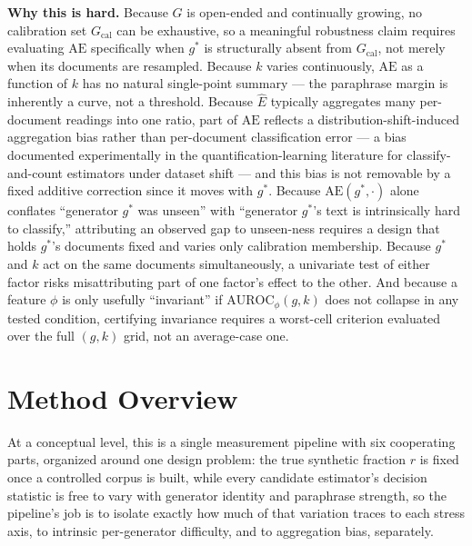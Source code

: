 \documentclass[11pt]{article}
\begin{document}
\noindent\textbf{Why this is hard.} Because $G$ is open-ended and continually growing, no calibration set $G_{\text{cal}}$ can be exhaustive, so a meaningful robustness claim requires evaluating $\mathrm{AE}$ specifically when $g^*$ is structurally absent from $G_{\text{cal}}$, not merely when its documents are resampled. Because $k$ varies continuously, $\mathrm{AE}$ as a function of $k$ has no natural single-point summary --- the paraphrase margin is inherently a curve, not a threshold. Because $\hat{E}$ typically aggregates many per-document readings into one ratio, part of $\mathrm{AE}$ reflects a distribution-shift-induced aggregation bias rather than per-document classification error --- a bias documented experimentally in the quantification-learning literature for classify-and-count estimators under dataset shift \citep{QuantDatasetShift2023} --- and this bias is not removable by a fixed additive correction since it moves with $g^*$. Because $\mathrm{AE}(g^*, \cdot)$ alone conflates ``generator $g^*$ was unseen'' with ``generator $g^*$'s text is intrinsically hard to classify,'' attributing an observed gap to unseen-ness requires a design that holds $g^*$'s documents fixed and varies only calibration membership. Because $g^*$ and $k$ act on the same documents simultaneously, a univariate test of either factor risks misattributing part of one factor's effect to the other. And because a feature $\phi$ is only usefully ``invariant'' if $\mathrm{AUROC}_\phi(g,k)$ does not collapse in any tested condition, certifying invariance requires a worst-cell criterion evaluated over the full $(g,k)$ grid, not an average-case one.

\section{Method Overview}

At a conceptual level, this is a single measurement pipeline with six cooperating parts, organized around one design problem: the true synthetic fraction $r$ is fixed once a controlled corpus is built, while every candidate estimator's decision statistic is free to vary with generator identity and paraphrase strength, so the pipeline's job is to isolate exactly how much of that variation traces to each stress axis, to intrinsic per-generator difficulty, and to aggregation bias, separately.
\end{document}
